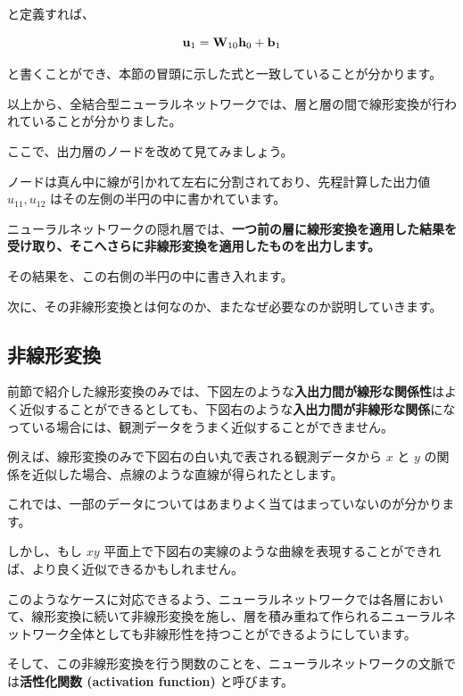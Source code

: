と定義すれば、


\[
{\bf u}_1 = {\bf W}_{10} {\bf h}_0 + {\bf b}_1
\]


と書くことができ、本節の冒頭に示した式と一致していることが分かります。


以上から、全結合型ニューラルネットワークでは、層と層の間で線形変換が行われていることが分かりました。

ここで、出力層のノードを改めて見てみましょう。

ノードは真ん中に線が引かれて左右に分割されており、先程計算した出力値 $u_{11}, u_{12}$ はその左側の半円の中に書かれています。




ニューラルネットワークの隠れ層では、\textbf{一つ前の層に線形変換を適用した結果を受け取り、そこへさらに非線形変換を適用したものを出力します。}

その結果を、この右側の半円の中に書き入れます。


次に、その非線形変換とは何なのか、またなぜ必要なのか説明していきます。


\subsection{非線形変換}


前節で紹介した線形変換のみでは、下図左のような\textbf{入出力間が線形な関係性}はよく近似することができるとしても、下図右のような\textbf{入出力間が非線形な関係}になっている場合には、観測データをうまく近似することができません。


例えば、線形変換のみで下図右の白い丸で表される観測データから $x$ と $y$ の関係を近似した場合、点線のような直線が得られたとします。

これでは、一部のデータについてはあまりよく当てはまっていないのが分かります。

しかし、もし $xy$ 平面上で下図右の実線のような曲線を表現することができれば、より良く近似できるかもしれません。




このようなケースに対応できるよう、ニューラルネットワークでは各層において、線形変換に続いて非線形変換を施し、層を積み重ねて作られるニューラルネットワーク全体としても非線形性を持つことができるようにしています。


そして、この非線形変換を行う関数のことを、ニューラルネットワークの文脈では\textbf{活性化関数 (activation function)} と呼びます。


